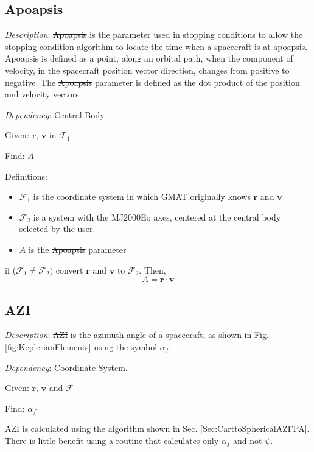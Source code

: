 \subsection{Apoapsis} 

\noindent \textit{Description}: \st{Apoapsis} is the parameter used
in stopping conditions to allow the stopping condition algorithm to
locate the time when a spacecraft is at apoapsis. Apoapsis is
defined as a point, along an orbital path, when the component of
velocity, in the spacecraft position vector direction, changes from
positive to negative.  The \st{Apoapsis} parameter is defined as the
dot product of the position and velocity vectors.

\noindent \textit{Dependency}:  Central Body.

\noindent Given:  $\mathbf{r}$, $\mathbf{v}$ in $\mathcal{F}_1$

\noindent Find:  $A$

\noindent Definitions:
%
\begin{itemize}
     \item $\mathcal{F}_1$ is the coordinate system in which GMAT originally knows $\mathbf{r}$ and $\mathbf{v}$
     \item $\mathcal{F}_2$ is a system with the MJ2000Eq axes, centered at the central body selected by the user.
     \item $A$ is the \st{Apoapsis} parameter
\end{itemize}
%

if ($\mathcal{F}_1 \neq \mathcal{F}_2)$ convert $\mathbf{r}$ and
$\mathbf{v}$ to $\mathcal{F}_2$.  Then,
%
\begin{equation}
     A = \mathbf{r} \cdot \mathbf{v}
\end{equation}

\subsection{AZI} 

\noindent \textit{Description}: \st{AZI} is the azimuth angle of a
spacecraft, as shown in Fig. \ref{fig:KeplerianElements} using the
symbol $\alpha_f$.

\noindent \textit{Dependency}:  Coordinate System.

\noindent Given:  $\mathbf{r}$, $\mathbf{v}$ and $\mathcal{F}$

\noindent Find:  $\alpha_f$


AZI is calculated using the algorithm shown in Sec.
\ref{Sec:CarttoSphericalAZFPA}.  There is little benefit using a
routine that calculates only $\alpha_f$ and not $\psi$.

